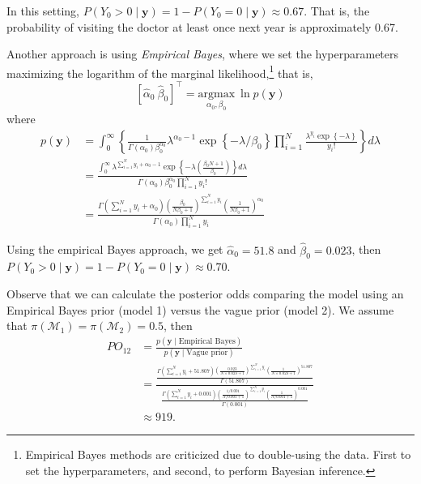 In this setting, \( P(Y_0 > 0 \mid \mathbf{y}) = 1 - P(Y_0 = 0 \mid \mathbf{y}) \approx 0.67 \). That is, the probability of visiting the doctor at least once next year is approximately 0.67.

Another approach is using \textit{Empirical Bayes}, where we set the hyperparameters maximizing the logarithm of the marginal likelihood,\footnote{Empirical Bayes methods are criticized due to double-using the data. First to set the hyperparameters, and second, to perform Bayesian inference.} that is,
\[
\left[\hat{\alpha}_0 \ \hat{\beta}_0\right]^{\top} = \underset{\alpha_0, \beta_0}{\mathrm{argmax}} \ \ln p(\mathbf{y})
\]
where
\begin{align*}
	p(\mathbf{y})&=\int_0^{\infty}\left\{\frac{1}{\Gamma(\alpha_0)\beta_0^{\alpha_0}}\lambda^{\alpha_0-1}\exp\left\{-\lambda/\beta_0\right\} \prod_{i=1}^N\frac{\lambda^{y_i}\exp\left\{-\lambda\right\}}{ y_i!}\right\}d\lambda\\
	&=\frac{\int_0^{\infty}\lambda^{\sum_{i=1}^N y_i+\alpha_0-1}\exp\left\{-\lambda \left(\frac{\beta_0 N +1}{\beta_0}\right) \right\}d\lambda}{\Gamma(\alpha_0)\beta_0^{\alpha_0}\prod_{i=1}^N y_i!}\\
	&=\frac{\Gamma(\sum_{i=1}^N y_i+\alpha_0)\left(\frac{\beta_0}{N\beta_0+1}\right)^{\sum_{i=1}^N y_i}\left(\frac{1}{N\beta_0+1}\right)^{\alpha_0}}{\Gamma(\alpha_0)\prod_{i=1}^N y_i}
\end{align*}

Using the empirical Bayes approach, we get $\hat{\alpha}_0 = 51.8$ and $\hat{\beta}_0 = 0.023$, then $P(Y_0 > 0 \mid \mathbf{y}) = 1 - P(Y_0 = 0 \mid \mathbf{y}) \approx 0.70$.

Observe that we can calculate the posterior odds comparing the model using an Empirical Bayes prior (model 1) versus the vague prior (model 2). We assume that $\pi(\mathcal{M}_1) = \pi(\mathcal{M}_2) = 0.5$, then
\begin{align*}
	PO_{12}&=\frac{p(\mathbf{y}\mid \text{Empirical Bayes})}{p(\mathbf{y}\mid \text{Vague prior})}\\
	&=\frac{\frac{\Gamma(\sum_{i=1}^N y_i+51.807)\left(\frac{0.023}{N\times 0.023+1}\right)^{\sum_{i=1}^N y_i}\left(\frac{1}{N\times 0.023+1}\right)^{51.807}}{\Gamma(51.807)}}{\frac{\Gamma(\sum_{i=1}^N y_i+0.001)\left(\frac{1/0.001}{N/0.001+1}\right)^{\sum_{i=1}^N y_i}\left(\frac{1}{N/0.001+1}\right)^{0.001}}{\Gamma(0.001)}}\\
	&\approx 919.
\end{align*}

